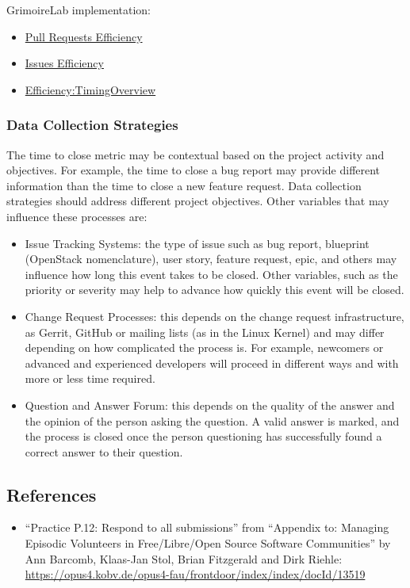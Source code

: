 GrimoireLab implementation:

\begin{itemize}
\tightlist
\item
  \href{https://chaoss.github.io/grimoirelab-sigils/panels/github-pullrequests-efficiency/}{Pull
  Requests Efficiency}
\item
  \href{https://chaoss.github.io/grimoirelab-sigils/panels/github-issues-efficiency/}{Issues
  Efficiency}
\item
  \href{https://chaoss.github.io/grimoirelab-sigils/panels/efficiency-timing-overview/}{Efficiency:TimingOverview}
\end{itemize}

\hypertarget{data-collection-strategies}{%
\subsubsection{Data Collection
Strategies}\label{data-collection-strategies}}

The time to close metric may be contextual based on the project activity
and objectives. For example, the time to close a bug report may provide
different information than the time to close a new feature request. Data
collection strategies should address different project objectives. Other
variables that may influence these processes are:

\begin{itemize}
\tightlist
\item
  Issue Tracking Systems: the type of issue such as bug report,
  blueprint (OpenStack nomenclature), user story, feature request, epic,
  and others may influence how long this event takes to be closed. Other
  variables, such as the priority or severity may help to advance how
  quickly this event will be closed.
\item
  Change Request Processes: this depends on the change request
  infrastructure, as Gerrit, GitHub or mailing lists (as in the Linux
  Kernel) and may differ depending on how complicated the process is.
  For example, newcomers or advanced and experienced developers will
  proceed in different ways and with more or less time required.
\item
  Question and Answer Forum: this depends on the quality of the answer
  and the opinion of the person asking the question. A valid answer is
  marked, and the process is closed once the person questioning has
  successfully found a correct answer to their question.
\end{itemize}

\hypertarget{references}{%
\subsection{References}\label{references}}

\begin{itemize}
\tightlist
\item
  ``Practice P.12: Respond to all submissions'' from ``Appendix to:
  Managing Episodic Volunteers in Free/Libre/Open Source Software
  Communities'' by Ann Barcomb, Klaas-Jan Stol, Brian Fitzgerald and
  Dirk Riehle:
  \url{https://opus4.kobv.de/opus4-fau/frontdoor/index/index/docId/13519}
\end{itemize}
